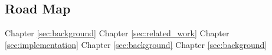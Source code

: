 \subsection{Road Map}

Chapter \ref{sec:background}
Chapter \ref{sec:related_work}
Chapter \ref{sec:implementation}
Chapter \ref{sec:background}
Chapter \ref{sec:background}